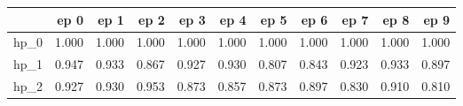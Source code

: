 \begin{tabular}{lrrrrrrrrrr}
\toprule
{} &   ep 0 &   ep 1 &   ep 2 &   ep 3 &   ep 4 &   ep 5 &   ep 6 &   ep 7 &   ep 8 &   ep 9 \\
\midrule
hp\_0 &  1.000 &  1.000 &  1.000 &  1.000 &  1.000 &  1.000 &  1.000 &  1.000 &  1.000 &  1.000 \\
hp\_1 &  0.947 &  0.933 &  0.867 &  0.927 &  0.930 &  0.807 &  0.843 &  0.923 &  0.933 &  0.897 \\
hp\_2 &  0.927 &  0.930 &  0.953 &  0.873 &  0.857 &  0.873 &  0.897 &  0.830 &  0.910 &  0.810 \\
\bottomrule
\end{tabular}
